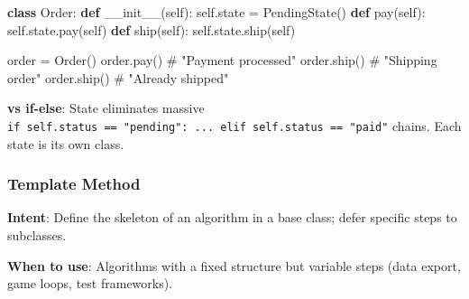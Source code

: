 \documentclass[11pt]{article}
\newenvironment{Shaded}{\begin{snugshade}}{\end{snugshade}}
\newcommand{\CommentTok}[1]{\textcolor[rgb]{0.48,0.49,0.49}{#1}}
\newcommand{\FunctionTok}[1]{\textcolor[rgb]{0.56,0.27,0.68}{#1}}
\newcommand{\KeywordTok}[1]{\textcolor[rgb]{0.81,0.81,0.76}{\textbf{#1}}}
\newcommand{\NormalTok}[1]{\textcolor[rgb]{0.81,0.81,0.76}{#1}}
\newcommand{\OperatorTok}[1]{\textcolor[rgb]{0.81,0.81,0.76}{#1}}
\newcommand{\VariableTok}[1]{\textcolor[rgb]{0.15,0.68,0.68}{#1}}
\begin{document}
\begin{Shaded}
\begin{Highlighting}[]
\KeywordTok{class}\NormalTok{ Order:}
    \KeywordTok{def} \FunctionTok{\_\_init\_\_}\NormalTok{(}\VariableTok{self}\NormalTok{): }\VariableTok{self}\NormalTok{.state }\OperatorTok{=}\NormalTok{ PendingState()}
    \KeywordTok{def}\NormalTok{ pay(}\VariableTok{self}\NormalTok{): }\VariableTok{self}\NormalTok{.state.pay(}\VariableTok{self}\NormalTok{)}
    \KeywordTok{def}\NormalTok{ ship(}\VariableTok{self}\NormalTok{): }\VariableTok{self}\NormalTok{.state.ship(}\VariableTok{self}\NormalTok{)}

\NormalTok{order }\OperatorTok{=}\NormalTok{ Order()}
\NormalTok{order.pay()    }\CommentTok{\# "Payment processed"}
\NormalTok{order.ship()   }\CommentTok{\# "Shipping order"}
\NormalTok{order.ship()   }\CommentTok{\# "Already shipped"}
\end{Highlighting}
\end{Shaded}

\textbf{vs if-else}: State eliminates massive \texttt{if\ self.status\ ==\ "pending":\ ...\ elif\ self.status\ ==\ "paid"} chains. Each state is its own class.

\subsubsection{Template Method}\label{template-method}

\textbf{Intent}: Define the skeleton of an algorithm in a base class; defer specific steps to subclasses.

\textbf{When to use}: Algorithms with a fixed structure but variable steps (data export, game loops, test frameworks).

\end{document}
